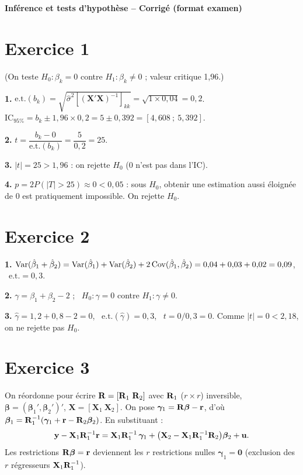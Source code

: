 \documentclass[11pt,a4paper]{article}
\newcommand{\vy}{\mathbf{y}}\newcommand{\vX}{\mathbf{X}}\newcommand{\vZ}{\mathbf{Z}}\newcommand{\vb}{\mathbf{b}}
\newcommand{\vbeta}{\bm{\beta}}\newcommand{\vgamma}{\bm{\gamma}}\newcommand{\veps}{\bm{\epsilon}}
\begin{document}
\begin{center}
{\Large\bfseries Inférence et tests d'hypothèse -- Corrigé (format examen)}
\end{center}

\section*{Exercice 1}
(On teste $H_0:\beta_k=0$ contre $H_1:\beta_k\neq0$ ; valeur critique 1,96.)

\textbf{1.} $\text{e.t.}(b_k)=\sqrt{\hat\sigma^2[(\vX'\vX)^{-1}]_{kk}}=\sqrt{1\times0{,}04}=0{,}2$. \quad
$\text{IC}_{95\%}=b_k\pm1{,}96\times0{,}2=5\pm0{,}392=[4{,}608\ ;\ 5{,}392]$.

\textbf{2.} $t=\dfrac{b_k-0}{\text{e.t.}(b_k)}=\dfrac{5}{0{,}2}=25$.

\textbf{3.} $|t|=25>1{,}96$ : on rejette $H_0$ (0 n'est pas dans l'IC).

\textbf{4.} $p=2P(|T|>25)\approx0<0{,}05$ : sous $H_0$, obtenir une estimation aussi éloignée de 0 est pratiquement impossible. On rejette $H_0$.

\section*{Exercice 2}

\textbf{1.} $\operatorname{Var}(\hat\beta_1+\hat\beta_2)=\operatorname{Var}(\hat\beta_1)+\operatorname{Var}(\hat\beta_2)+2\operatorname{Cov}(\hat\beta_1,\hat\beta_2)=0{,}04+0{,}03+0{,}02=0{,}09$, \ $\text{e.t.}=0{,}3$.

\textbf{2.} $\gamma=\beta_1+\beta_2-2$ ; \ $H_0:\gamma=0$ contre $H_1:\gamma\neq0$.

\textbf{3.} $\hat\gamma=1{,}2+0{,}8-2=0$, \ $\text{e.t.}(\hat\gamma)=0{,}3$, \ $t=0/0{,}3=0$. Comme $|t|=0<2{,}18$, on ne rejette pas $H_0$.

\section*{Exercice 3}

On réordonne pour écrire $\Rm=[\Rm_1\ \Rm_2]$ avec $\mathbf{R}_1$ ($r\times r$) inversible, $\vbeta=(\vbeta_1',\vbeta_2')'$, $\vX=[\vX_1\ \vX_2]$. On pose $\vgamma_1=\Rm\vbeta-\vr$, d'où $\vbeta_1=\Rm_1^{-1}(\vgamma_1+\vr-\Rm_2\vbeta_2)$. En substituant :
\[
\vy-\vX_1\Rm_1^{-1}\vr=\vX_1\Rm_1^{-1}\,\vgamma_1+\big(\vX_2-\vX_1\Rm_1^{-1}\Rm_2\big)\vbeta_2+\vu .
\]
Les restrictions $\Rm\vbeta=\vr$ deviennent les $r$ restrictions nulles $\vgamma_1=\mathbf 0$ (exclusion des $r$ régresseurs $\vX_1\Rm_1^{-1}$).
\end{document}
